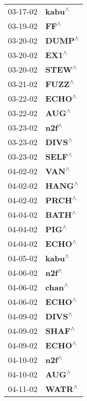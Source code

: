 \begin{supertabular}{p{0.08\textwidth}p{0.2\textwidth}}
 03-17-02 &    \textbf{kabu\textsuperscript{$\wedge$}} \\
 03-19-02 &      \textbf{FF\textsuperscript{$\wedge$}} \\
 03-20-02 &    \textbf{DUMP\textsuperscript{$\wedge$}} \\
 03-20-02 &     \textbf{EX1\textsuperscript{$\wedge$}} \\
 03-20-02 &    \textbf{STEW\textsuperscript{$\wedge$}} \\
 03-21-02 &    \textbf{FUZZ\textsuperscript{$\wedge$}} \\
 03-22-02 &    \textbf{ECHO\textsuperscript{$\wedge$}} \\
 03-22-02 &     \textbf{AUG\textsuperscript{$\wedge$}} \\
 03-23-02 &     \textbf{n2f\textsuperscript{$\wedge$}} \\
 03-23-02 &    \textbf{DIVS\textsuperscript{$\wedge$}} \\
 03-23-02 &    \textbf{SELF\textsuperscript{$\wedge$}} \\
 04-02-02 &     \textbf{VAN\textsuperscript{$\wedge$}} \\
 04-02-02 &    \textbf{HANG\textsuperscript{$\wedge$}} \\
 04-02-02 &    \textbf{PRCH\textsuperscript{$\wedge$}} \\
 04-04-02 &    \textbf{BATH\textsuperscript{$\wedge$}} \\
 04-04-02 &     \textbf{PIG\textsuperscript{$\wedge$}} \\
 04-04-02 &    \textbf{ECHO\textsuperscript{$\wedge$}} \\
 04-05-02 &    \textbf{kabu\textsuperscript{$\wedge$}} \\
 04-06-02 &     \textbf{n2f\textsuperscript{$\wedge$}} \\
 04-06-02 &    \textbf{chan\textsuperscript{$\wedge$}} \\
 04-06-02 &    \textbf{ECHO\textsuperscript{$\wedge$}} \\
 04-09-02 &    \textbf{DIVS\textsuperscript{$\wedge$}} \\
 04-09-02 &    \textbf{SHAF\textsuperscript{$\wedge$}} \\
 04-09-02 &    \textbf{ECHO\textsuperscript{$\wedge$}} \\
 04-10-02 &     \textbf{n2f\textsuperscript{$\wedge$}} \\
 04-10-02 &     \textbf{AUG\textsuperscript{$\wedge$}} \\
 04-11-02 &    \textbf{WATR\textsuperscript{$\wedge$}} \\

\end{supertabular}

